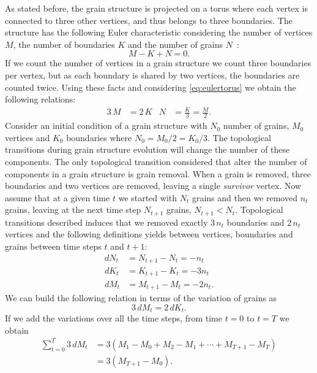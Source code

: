 As stated before, the grain structure is projected on a torus where each vertex is connected to three other vertices, and thus belongs to three boundaries. 
The structure has the following Euler characteristic considering the number of vertices $M$, the number of boundaries $K$ and the number of grains $N$~\cite{sausset2007periodic}:
\begin{equation}
M - K + N = 0.
\label{eq:eulertorus}
\end{equation}
If we count the number of vertices in a grain structure we count three boundaries per vertex, but as each boundary is shared by two vertices, the boundaries are counted twice. Using these facts and considering \eqref{eq:eulertorus} we obtain the following relations:
\begin{align*}
    3\,M &= 2\,K & 
    N &= \frac{K}{3} = \frac{M}{2}.
\end{align*}
Consider an initial condition of a grain structure with $N_0$ number of grains, $M_0$ vertices and $K_0$ boundaries where $N_0 = M_0/2 = K_0 / 3$. 
The topological transitions during grain structure evolution will change the number of these components. 
The only topological transition considered that alter the number of components in a grain structure is  grain removal.
When a grain is removed, three boundaries and two vertices are removed, leaving a single \emph{survivor} vertex.
Now assume that at a given time $t$ we started with $N_t$ grains and then we removed $n_t$ grains, leaving at the next time step $N_{t+1}$ grains, $N_{t+1} < N_{t}$. 
Topological transitions described induces that we removed exactly $3\,n_t$ boundaries and $2\,n_t$ vertices and the following definitions yields between vertices, boundaries and grains between time steps $t$ and $t+1$:
 \begin{align*}
     dN_t &= N_{t+1} - N_{t} =  - n_t\\
     dK_t &= K_{t+1} - K_{t} = - 3n_t\\
     dM_t &= M_{t+1} - M_{t} = - 2n_t.
 \end{align*}
We can build the following relation in terms of the variation of grains as
\begin{equation}
    3\,dM_t = 2\,dK_t. \label{eq:dMdK}
\end{equation}
If we add the variations over all the time steps, from time $t=0$ to $t=T$ we obtain
\begin{align*}
    \sum_{t=0}^{T}3\,dM_t &= 3(M_1 - M_0 + M_2 - M_1 + \cdots + M_{T+1} - M_T) \\
    &= 3(M_{T+1} - M_0).
\end{align*}
